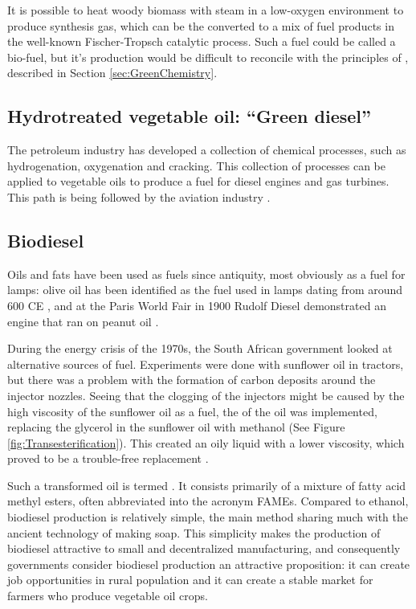 It is possible to heat woody biomass with steam in a low-oxygen environment to
produce synthesis gas, which can be the converted to a mix of fuel products in
the well-known Fischer-Tropsch catalytic process. Such a  fuel could be called a
bio-fuel, but it's production would be difficult to reconcile with the
principles of , described in Section
\ref{sec:GreenChemistry}.

\subsection{Hydrotreated vegetable oil: ``Green diesel''}
\label{sec:GreenDiesel}

The petroleum industry has developed a collection of chemical processes, such as
hydrogenation, oxygenation and cracking. This collection of processes can be
applied to vegetable oils to produce a fuel for diesel engines and gas turbines.
This path is being followed by the aviation industry \autocite{Chiaramonti2014}.

\subsection{Biodiesel}

Oils and fats have been used as fuels since antiquity, most obviously as a fuel
for lamps: olive oil has been identified as the fuel used in lamps dating from
around 600 CE \autocite{Kimpe2001}, and at the Paris World Fair in 1900 Rudolf
Diesel demonstrated an engine that ran on peanut oil \autocite{Knothe2010}.

During the energy crisis of the 1970s, the South African government looked at
alternative sources of fuel. Experiments were done with sunflower oil in
tractors, but there was a problem with the formation of carbon deposits around
the injector nozzles. Seeing that the clogging of the injectors might be caused
by the high viscosity of the sunflower oil as a fuel, the
 of the oil was implemented, replacing the glycerol
in the sunflower oil with methanol (See Figure \ref{fig:Transesterification}).
This created an oily liquid with a lower viscosity, which proved to be a
trouble-free replacement \autocite{VanNiekerk1980}.

Such a transformed oil is termed . It consists primarily of a
mixture of fatty acid methyl esters, often abbreviated into the acronym FAMEs.
Compared to ethanol, biodiesel production is relatively simple, the main method
sharing much with the ancient technology of making soap. This simplicity makes
the production of biodiesel attractive to small and decentralized manufacturing,
and consequently governments consider biodiesel production an attractive
proposition: it can create job opportunities in rural population and it can
create a stable market for farmers who produce vegetable oil crops.


